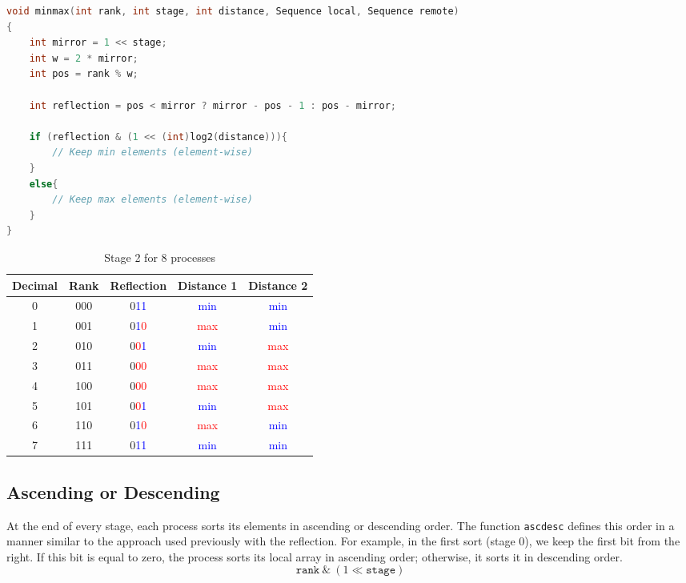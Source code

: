 \documentclass[12pt]{article}
\begin{document}
\vspace{0.3cm}
\begin{lstlisting}[language=C]
void minmax(int rank, int stage, int distance, Sequence local, Sequence remote)
{
    int mirror = 1 << stage;
    int w = 2 * mirror;
    int pos = rank % w;

    int reflection = pos < mirror ? mirror - pos - 1 : pos - mirror;

    if (reflection & (1 << (int)log2(distance))){
        // Keep min elements (element-wise)
    }
    else{
        // Keep max elements (element-wise)
    }
}

\end{lstlisting}

\begin{table}[h]
    \centering
    \begin{tabular}{|c|c|c|c|c|}
        \hline
        \textbf{Decimal} & \textbf{Rank} & \textbf{Reflection} & \textbf{Distance 1} & \textbf{Distance 2} \\ \hline
        0 & 000 & 0\textcolor{blue}{1}\textcolor{blue}{1} & \textcolor{blue}{min} & \textcolor{blue}{min} \\ \hline
        1 & 001 & 0\textcolor{blue}{1}\textcolor{red}{0} & \textcolor{red}{max} & \textcolor{blue}{min} \\ \hline
        2 & 010 & 0\textcolor{red}{0}\textcolor{blue}{1} & \textcolor{blue}{min} & \textcolor{red}{max} \\ \hline
        3 & 011 & 0\textcolor{red}{0}\textcolor{red}{0} & \textcolor{red}{max} & \textcolor{red}{max} \\ \hline
        4 & 100 & 0\textcolor{red}{0}\textcolor{red}{0} & \textcolor{red}{max} & \textcolor{red}{max} \\ \hline
        5 & 101 & 0\textcolor{red}{0}\textcolor{blue}{1} & \textcolor{blue}{min} & \textcolor{red}{max} \\ \hline
        6 & 110 & 0\textcolor{blue}{1}\textcolor{red}{0} & \textcolor{red}{max} & \textcolor{blue}{min} \\ \hline
        7 & 111 & 0\textcolor{blue}{1}\textcolor{blue}{1} & \textcolor{blue}{min} & \textcolor{blue}{min} \\ \hline
    \end{tabular}
    \caption{Stage 2 for 8 processes}
    \label{tab:xor}
\end{table}
\newpage

\subsection{Ascending or Descending}
At the end of every stage, each process sorts its elements in ascending or descending order. The function \texttt{ascdesc} defines this order in a manner similar to the approach used previously with the reflection. For example, in the first sort (stage 0), we keep the first bit from the right. If this bit is equal to zero, the process sorts its local array in ascending order; otherwise, it sorts it in descending order.
\[\texttt{rank} \ \&  \ (1 \ll \texttt{stage})\]
\end{document}
